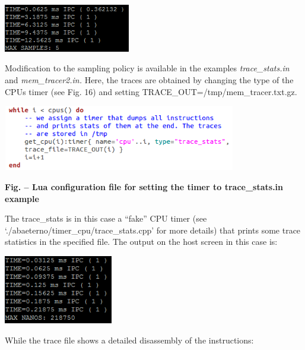 \documentclass[a4paper]{article}
\newcounter{Figure}
\renewcommand\theFigure{\arabic{Figure}}
\begin{document}
{\centering 
\includegraphics[width=2.1736in,height=0.8201in]{img27.png}
\par}

{
Modification to the sampling policy is available in the examples
\textit{trace\_stats.in} and \textit{mem\_tracer2.in.} Here, the traces
are obtained by changing the type of the CPU{\textquotesingle}s timer
(see Fig. 16) and setting
TRACE\_OUT={\textquotesingle}/tmp/mem\_tracer.txt.gz{\textquotesingle}.}

{\centering 
\includegraphics[width=4.011in,height=1.1283in]{img28.png}
\par}

{\centering{}\sffamily\bfseries
\label{bkm:Ref388170597}Fig.
\stepcounter{Figure}{\theFigure} -- Lua configuration file for setting
the timer to trace\_stats.in example
\par}

{
The trace\_stats is in this case a
{\textquotedblleft}fake{\textquotedblright} CPU timer (see
{\textquoteleft}./abaeterno/timer\_cpu/trace\_stats.cpp{\textquoteright}
for more details) that prints some trace statistics in the specified
file. The output on the host screen in this case is:}

{\centering 
\includegraphics[width=1.8736in,height=1.1827in]{img29.png}
\par}

{
While the trace file shows a detailed disassembly of the instructions:}
\end{document}
